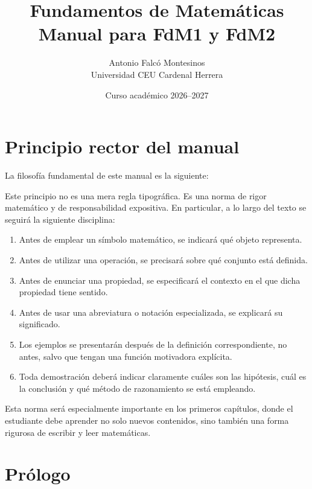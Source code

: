 \documentclass[11pt,a4paper,openany]{book}
\title{\Huge Fundamentos de Matemáticas\\[0.4cm]
\Large Manual para FdM1 y FdM2}
\author{Antonio Falcó Montesinos\\Universidad CEU Cardenal Herrera}
\date{Curso académico 2026--2027}
\begin{document}
\frontmatter
\maketitle

\chapter*{Principio rector del manual}

La filosofía fundamental de este manual es la siguiente:

\begin{center}
\end{center}

Este principio no es una mera regla tipográfica. Es una norma de rigor matemático y de responsabilidad expositiva. En particular, a lo largo del texto se seguirá la siguiente disciplina:

\begin{enumerate}[label=\textbf{R\arabic*.},leftmargin=2.5em]
  \item Antes de emplear un símbolo matemático, se indicará qué objeto representa.
  \item Antes de utilizar una operación, se precisará sobre qué conjunto está definida.
  \item Antes de enunciar una propiedad, se especificará el contexto en el que dicha propiedad tiene sentido.
  \item Antes de usar una abreviatura o notación especializada, se explicará su significado.
  \item Los ejemplos se presentarán después de la definición correspondiente, no antes, salvo que tengan una función motivadora explícita.
  \item Toda demostración deberá indicar claramente cuáles son las hipótesis, cuál es la conclusión y qué método de razonamiento se está empleando.
\end{enumerate}

Esta norma será especialmente importante en los primeros capítulos, donde el estudiante debe aprender no solo nuevos contenidos, sino también una forma rigurosa de escribir y leer matemáticas.

\chapter*{Prólogo}
\end{document}
